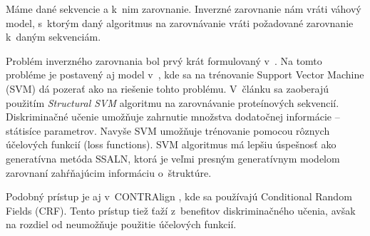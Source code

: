 \begin{df}
Máme dané sekvencie a k~nim zarovnanie. Inverzné zarovnanie nám vráti váhový model, s~ktorým daný algoritmus na zarovnávanie vráti požadované zarovnanie k~daným sekvenciám.
\end{df}

Problém inverzného zarovnania bol prvý krát formulovaný v~\cite{inverseAlign1}.
Na tomto probléme je postavený aj model v~\cite{svmTrainingProteinsAlignment}, kde sa na trénovanie Support Vector Machine (SVM) dá pozerať ako na riešenie tohto problému. V~článku sa zaoberajú použitím \textit{Structural SVM} algoritmu na zarovnávanie proteínových sekvencií. Diskriminačné učenie umožňuje zahrnutie množstva dodatočnej informácie -- státisíce parametrov.
Navyše SVM umožňuje trénovanie pomocou rôznych účelových funkcií (loss functions).
SVM algoritmus má lepšiu úspešnosť ako generatívna metóda SSALN, ktorá je veľmi presným generatívnym modelom zarovnaní zahŕňajúcim informáciu o~štruktúre.

Podobný prístup je aj v~CONTRAlign \cite{contralign}, kde sa používajú Conditional Random Fields (CRF). Tento prístup tiež ťaží z~benefitov diskriminačného učenia, avšak na rozdiel od \cite{svmTrainingProteinsAlignment} neumožňuje použitie účelových funkcií.
